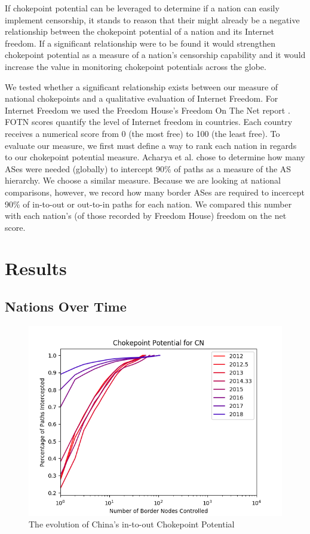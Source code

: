 \documentclass[10pt, conference, letterpaper]{IEEEtran}
\begin{document}
If chokepoint potential can be leveraged to determine if a nation can easily implement censorship, it stands to reason that their might already be a negative relationship between
the chokepoint potential of a nation and its Internet freedom. If a significant relationship were to be found it would strengthen chokepoint potential as a measure of a nation's censorship capability
and it would increase the value in monitoring chokepoint potentials across the globe.
\par
We tested whether a significant relationship exists between our measure of national chokepoints and a qualitative evaluation of Internet Freedom. For Internet Freedom we used
the Freedom House's Freedom On The Net report \cite{FOTN}. FOTN scores quantify the level of Internet freedom in countries. Each country receives a numerical score from 0 (the most free)
to 100 (the least free).
 To evaluate our measure, we first must define a way to rank each nation in regards to our chokepoint potential measure.
Acharya et al. \cite{throats} chose to determine how many ASes were needed (globally) to intercept 90\% of paths as a measure of the AS hierarchy. We choose a similar measure. Because we are
looking at national comparisons, however, we record how many border ASes are required to incercept 90\% of in-to-out or out-to-in paths for each nation. We compared this number
with each nation's (of those recorded by Freedom House) freedom on the net score.

\section{Results}
\subsection{Nations Over Time}

\begin{figure}
	\centering
	\includegraphics[width=\linewidth]{single_CN}
	\caption{The evolution of China's in-to-out Chokepoint Potential}\label{fig:ChinaChokePoint}
\end{figure}
\end{document}
